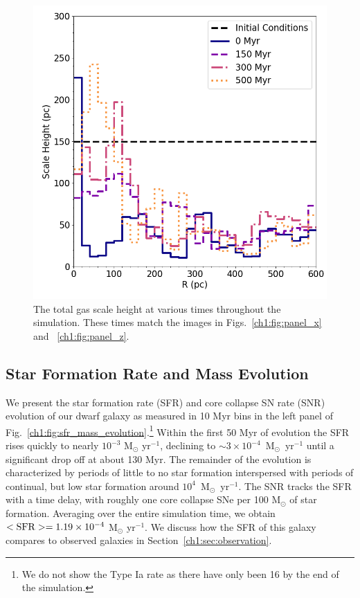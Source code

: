 \begin{figure}
\centering
\includegraphics[width=0.75\linewidth]{figures/ch1/scale_height}
\caption{The total gas scale height at various times throughout the simulation. These times match the images in Figs.~\ref{ch1:fig:panel_x} and ~\ref{ch1:fig:panel_z}.}
\label{ch1:fig:scale_height}
\end{figure}

\subsection{Star Formation Rate and Mass Evolution}
\label{ch1:sec:sfr}

We present the star formation rate (SFR) and core collapse SN rate (SNR) evolution of our dwarf galaxy as measured in 10 Myr bins in the left panel of Fig.~\ref{ch1:fig:sfr_mass_evolution}.\footnote{We do not show the Type Ia rate as there have only been 16 by the end of the simulation.} Within the first 50 Myr of evolution the SFR rises quickly to nearly $10^{-3}$ M$_{\odot}$ yr$^{-1}$, declining to $\sim 3 \times 10^{-4}$~M$_{\odot}$~yr$^{-1}$ until a significant drop off at about 130 Myr. The remainder of the evolution is characterized by periods of little to no star formation interspersed with periods of continual, but low star formation around $10^{4}$~M$_{\odot}$~yr$^{-1}$. The SNR tracks the SFR with a time delay, with roughly one core collapse SNe per 100 M$_{\odot}$ of star formation. Averaging over the entire simulation time, we obtain  $<\rm{SFR}> = 1.19 \times 10^{-4}$ M$_{\odot}$ yr$^{-1}$. We discuss how the SFR of this galaxy compares to observed galaxies in Section~\ref{ch1:sec:observation}.

